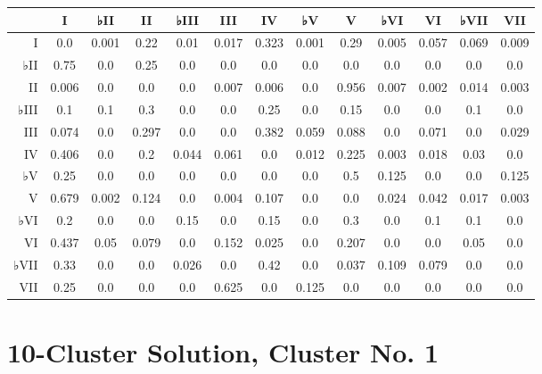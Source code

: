 \begin{table}[htbp]
\begin{minipage}{\linewidth}
\setlength{\tymax}{0.5\linewidth}
\centering
\small
\begin{tabulary}{\textwidth}{@{}RCCCCCCCCCCCC@{}} \toprule
&I&♭II&II&♭III&III&IV&♭V&V&♭VI&VI&♭VII&VII\\
\midrule
I&0.0&0.001&0.22&0.01&0.017&0.323&0.001&0.29&0.005&0.057&0.069&0.009\\
♭II&0.75&0.0&0.25&0.0&0.0&0.0&0.0&0.0&0.0&0.0&0.0&0.0\\
II&0.006&0.0&0.0&0.0&0.007&0.006&0.0&0.956&0.007&0.002&0.014&0.003\\
♭III&0.1&0.1&0.3&0.0&0.0&0.25&0.0&0.15&0.0&0.0&0.1&0.0\\
III&0.074&0.0&0.297&0.0&0.0&0.382&0.059&0.088&0.0&0.071&0.0&0.029\\
IV&0.406&0.0&0.2&0.044&0.061&0.0&0.012&0.225&0.003&0.018&0.03&0.0\\
♭V&0.25&0.0&0.0&0.0&0.0&0.0&0.0&0.5&0.125&0.0&0.0&0.125\\
V&0.679&0.002&0.124&0.0&0.004&0.107&0.0&0.0&0.024&0.042&0.017&0.003\\
♭VI&0.2&0.0&0.0&0.15&0.0&0.15&0.0&0.3&0.0&0.1&0.1&0.0\\
VI&0.437&0.05&0.079&0.0&0.152&0.025&0.0&0.207&0.0&0.0&0.05&0.0\\
♭VII&0.33&0.0&0.0&0.026&0.0&0.42&0.0&0.037&0.109&0.079&0.0&0.0\\
VII&0.25&0.0&0.0&0.0&0.625&0.0&0.125&0.0&0.0&0.0&0.0&0.0\\

\bottomrule

\end{tabulary}
\end{minipage}
\end{table}

\section{10-Cluster Solution, Cluster No. 1}
\label{10-clustersolutionclusterno.1}


